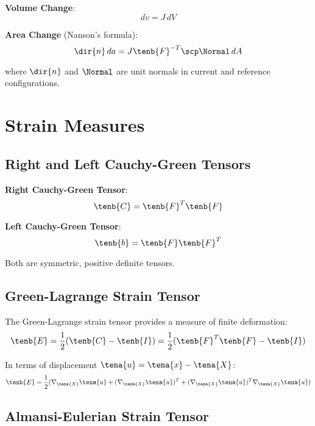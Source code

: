 \textbf{Volume Change}:
\begin{equation}
dv = J \, dV
\end{equation}

\textbf{Area Change} (Nanson's formula):
\begin{equation}
\dir{n} \, da = J \tenb{F}^{-T} \scp \Normal \, dA
\end{equation}

where $\dir{n}$ and $\Normal$ are unit normals in current and reference configurations.

\section{Strain Measures}

\subsection{Right and Left Cauchy-Green Tensors}

\textbf{Right Cauchy-Green Tensor}:
\begin{equation}
\tenb{C} = \tenb{F}^T \tenb{F}
\end{equation}

\textbf{Left Cauchy-Green Tensor}:
\begin{equation}
\tenb{b} = \tenb{F} \tenb{F}^T
\end{equation}

Both are symmetric, positive definite tensors.

\subsection{Green-Lagrange Strain Tensor}

The Green-Lagrange strain tensor provides a measure of finite deformation:
\begin{equation}
\tenb{E} = \frac{1}{2}(\tenb{C} - \tenb{I}) = \frac{1}{2}(\tenb{F}^T \tenb{F} - \tenb{I})
\end{equation}

In terms of displacement $\tena{u} = \tena{x} - \tena{X}$:
\begin{equation}
\tenb{E} = \frac{1}{2}(\nabla_{\tena{X}} \tena{u} + (\nabla_{\tena{X}} \tena{u})^T + (\nabla_{\tena{X}} \tena{u})^T \nabla_{\tena{X}} \tena{u})
\end{equation}

\subsection{Almansi-Eulerian Strain Tensor}

